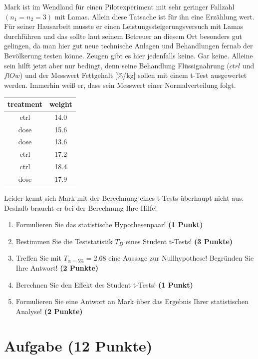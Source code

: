 \documentclass[a4paper, 9pt]{scrartcl}\usepackage[]{graphicx}\usepackage[]{xcolor}
\begin{document}
Mark ist im Wendland für einen Pilotexperiment mit sehr geringer Fallzahl $(n_1 = n_2 = 3)$ mit Lamas. Allein diese Tatsache ist für ihn eine Erzählung wert. Für seiner Hausarbeit musste er einen Leistungssteigerungsversuch mit Lamas durchführen und das sollte laut seinem Betreuer an diesem Ort besonders gut gelingen, da man hier gut neue technische Anlagen und Behandlungen fernab der Bevölkerung testen könne. Zeugen gibt es hier jedenfalls keine. Gar keine. Alleine sein hilft jetzt aber nur bedingt, denn seine Behandlung Flüssignahrung ($ctrl$ und $flOw$) und der Messwert Fettgehalt [\%/kg] sollen mit einem t-Test ausgewertet werden. Immerhin weiß er, dass sein Messwert einer Normalverteilung folgt. 

\begin{table}[!h]
\centering
\begin{tabular}{cc}
\toprule
treatment & weight\\
\midrule
ctrl & 14.0\\
dose & 15.6\\
dose & 13.6\\
ctrl & 17.2\\
ctrl & 18.4\\
\addlinespace
dose & 17.9\\
\bottomrule
\end{tabular}
\end{table}



Leider kennt sich Mark mit der Berechnung eines t-Tests überhaupt nicht aus. Deshalb braucht er bei der Berechnung Ihre Hilfe!

\begin{enumerate}
  \item Formulieren Sie das statistische Hypothesenpaar! \textbf{(1 Punkt)}
  \item Bestimmen Sie die Teststatistik $T_{D}$ eines Student t-Tests! \textbf{(3 Punkte)}
  \item Treffen Sie mit $T_{\alpha = 5\%} = 2.68$ eine Aussage zur Nullhypothese! Begründen Sie Ihre Antwort! \textbf{(2 Punkte)}
  \item Berechnen Sie den Effekt des Student t-Tests! \textbf{(1 Punkt)}
  \item Formulieren Sie eine Antwort an Mark über das Ergebnis Ihrer statistischen Analyse! \textbf{(2 Punkte)}
\end{enumerate} 
\clearpage

\section{Aufgabe \hfill (12 Punkte)}
\end{document}
